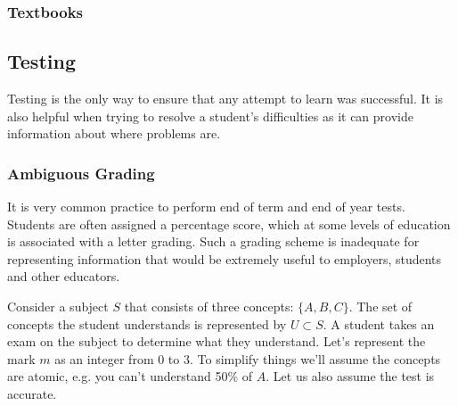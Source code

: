       \subsubsection{Textbooks}

    \subsection{Testing}
      Testing is the only way to ensure that any attempt to learn was successful. It is also helpful when trying to resolve a student's difficulties as it can provide information about where problems are.

      \subsubsection{Ambiguous Grading}
        It is very common practice to perform end of term and end of year tests. Students are often assigned a percentage score, which at some levels of education is associated with a letter grading. Such a grading scheme is inadequate for representing information that would be extremely useful to employers, students and other educators.

        Consider a subject \(S\) that consists of three concepts: \(\{A, B, C\}\). The set of concepts the student understands is represented by \(U \subset S\). A student takes an exam on the subject to determine what they understand. Let's represent the mark \(m\) as an integer from 0 to 3. To simplify things we'll assume the concepts are atomic, e.g. you can't understand 50\% of \(A\). Let us also assume the test is accurate.


